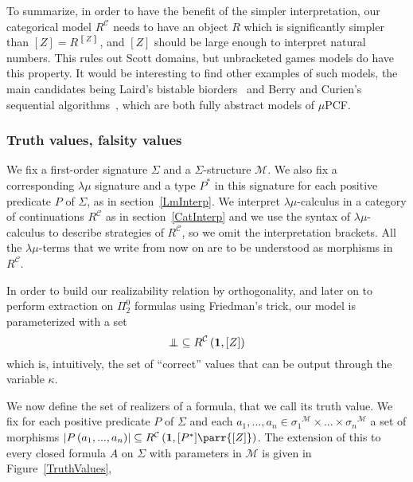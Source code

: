 \documentclass{CSML}
\renewcommand{\ldots}{...}
\newcommand*\SortA{\sigma}
\newcommand*\LogFormA{A}
\newcommand*\LogPredA{P}
\newcommand*\ModM{\mathcal{M}}
\newcommand*\ModElemA{a}
\newcommand*\ModMInterp[1]{{#1}^\ModM}
\newcommand*\LmSortExtract{Z}
\newcommand*\LmInterpForm[1]{{#1}^*}
\newcommand*\CatC{\mathcal{C}}
\newcommand*\CatR{R}
\newcommand*\CatRC{\CatExp{\CatR}{\CatC}}
\newcommand*\CatExp[2]{#1^{#2}}
\newcommand*\CatPar\parr
\newcommand*\CatTerm{\mathbf{1}}
\newcommand*\CatInterpSortNeg[1]{{\left\llbracket#1\right\rrbracket}}
\newcommand*\CatInterpSort[1]{{\left[#1\right]}}
\newcommand*\RealVal[1]{\left|#1\right|}
\newcommand*\RealBot{{\bot\mkern-11mu\bot}}
\begin{document}
To summarize, in order to have the benefit of the simpler interpretation, our categorical model $\CatRC$ needs to have an object $\CatR$ which is significantly simpler than $\CatInterpSort{\LmSortExtract}=\CatExp{\CatR}{\CatInterpSortNeg{\LmSortExtract}}$, and $\CatInterpSort{\LmSortExtract}$ should be large enough to interpret natural numbers. This rules out Scott domains, but unbracketed games models do have this property. It would be interesting to find other examples of such models, the main candidates being Laird's bistable biorders~\cite{LairdBistable} and Berry and Curien's sequential algorithms~\cite{BerryCurienSequential}, which are both fully abstract models of $\mu$PCF.
\subsubsection{Truth values, falsity values}
\label{OrthoReal}
We fix a first-order signature $\Sigma$ and a $\Sigma$-structure $\ModM$. We also fix a corresponding $\lambda\mu$ signature and a type $\LmInterpForm{\LogPredA}$ in this signature for each positive predicate $\LogPredA$ of $\Sigma$, as in section~\ref{LmInterp}. We interpret $\lambda\mu$-calculus in a category of continuations $\CatRC$ as in section~\ref{CatInterp} and we use the syntax of $\lambda\mu$-calculus to describe strategies of $\CatRC$, so we omit the interpretation brackets. All the $\lambda\mu$-terms that we write from now on are to be understood as morphisms in $\CatRC$.\par
In order to build our realizability relation by orthogonality, and later on to perform extraction on $\Pi^0_2$ formulas using Friedman's trick, our model is parameterized with a set
$$\RealBot\subseteq\CatRC\left(\CatTerm,\CatInterpSort{\LmSortExtract}\right)$$
which is, intuitively, the set of ``correct'' values that can be output through the variable $\kappa$.\par
We now define the set of realizers of a formula, that we call its truth value. We fix for each positive predicate $\LogPredA$ of $\Sigma$ and each $\ModElemA_1,\ldots,\ModElemA_n\in\ModMInterp{\SortA_1}\times\ldots\times\ModMInterp{\SortA_n}$ a set of morphisms $\RealVal{\LogPredA\left(\ModElemA_1,\ldots,\ModElemA_n\right)}\subseteq\CatRC\left(\CatTerm,\CatInterpSort{\LmInterpForm{\LogPredA}}\CatPar\CatInterpSort{\LmSortExtract}\right)$. The extension of this to every closed formula $\LogFormA$ on $\Sigma$ with parameters in $\ModM$ is given in Figure~\ref{TruthValues},
\end{document}
